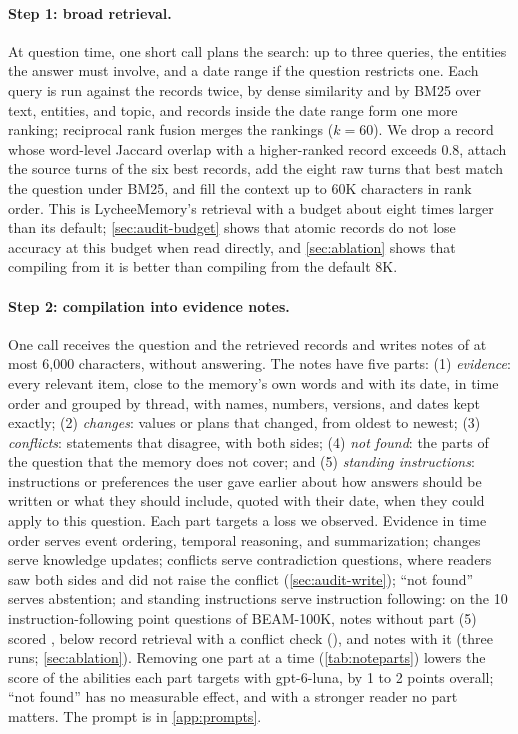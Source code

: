 \paragraph{Step 1: broad retrieval.}
At question time, one short call plans the search: up to three queries, the entities the answer must involve, and a
date range if the question restricts one. Each query is run against the records twice, by dense similarity and by
BM25 over text, entities, and topic, and records inside the date range form one more ranking; reciprocal rank fusion
merges the rankings ($k=60$). We drop a record whose word-level Jaccard overlap with a higher-ranked record exceeds 0.8, attach the source turns of the six best
records, add the eight raw turns that best match the question under BM25, and fill the context up to 60K characters in rank order. This is
LycheeMemory's retrieval with a budget about eight times larger than its default; \cref{sec:audit-budget} shows that
atomic records do not lose accuracy at this budget when read directly, and \cref{sec:ablation} shows that compiling
from it is better than compiling from the default 8K.

\paragraph{Step 2: compilation into evidence notes.}
One call receives the question and the retrieved records and writes notes of at most 6,000 characters, without
answering. The notes have five parts:
(1) \emph{evidence}: every relevant item, close to the memory's own words and with its date, in time order and grouped
by thread, with names, numbers, versions, and dates kept exactly;
(2) \emph{changes}: values or plans that changed, from oldest to newest;
(3) \emph{conflicts}: statements that disagree, with both sides;
(4) \emph{not found}: the parts of the question that the memory does not cover; and
(5) \emph{standing instructions}: instructions or preferences the user gave earlier about how answers should be
written or what they should include, quoted with their date, when they could apply to this question.
Each part targets a loss we observed. Evidence in time order serves event ordering, temporal reasoning, and
summarization; changes serve knowledge updates; conflicts serve contradiction questions, where readers saw both sides
and did not raise the conflict (\cref{sec:audit-write}); ``not found'' serves abstention; and standing instructions serve instruction following: on the 10 instruction-following point questions of BEAM-100K, notes without part (5) scored , below record retrieval with a conflict check (), and notes with it  (three runs; \cref{sec:ablation}). Removing one part at a time (\cref{tab:noteparts}) lowers the score of the abilities each part targets with gpt-6-luna, by 1 to 2 points overall; ``not found'' has no measurable effect, and with a stronger reader no part matters. The prompt is in \cref{app:prompts}.

